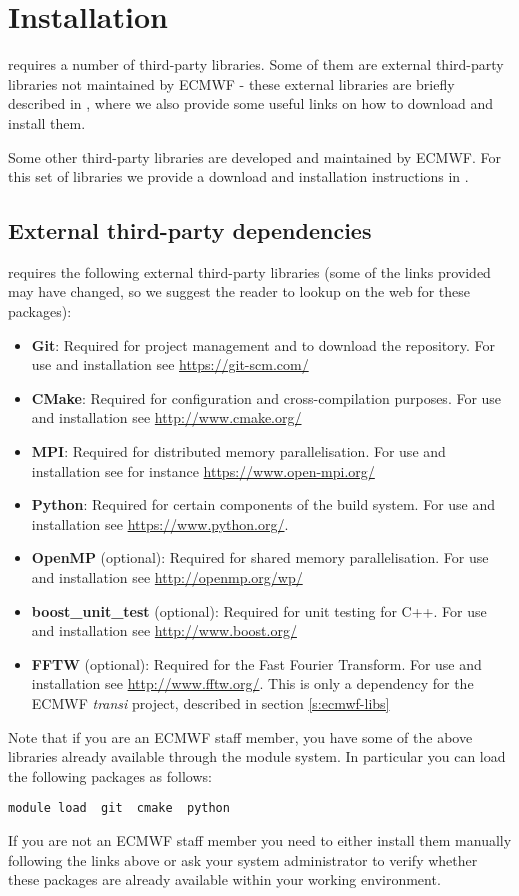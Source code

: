 \section{Installation}
\label{s:installation}
\Atlas requires a number of third-party libraries. 
Some of them are external third-party libraries not maintained 
by ECMWF - these external libraries are briefly described 
in , where we also provide some 
useful links on how to download and install them. 

Some other third-party libraries are developed and maintained 
by ECMWF. For this set of libraries we provide a download and 
installation instructions in .

\subsection{External third-party dependencies}
\label{s:external-libs}
\Atlas requires the following external third-party libraries 
(some of the links provided may have changed, so we suggest 
the reader to lookup on the web for these packages):
%
\begin{itemize}
\item \textbf{Git}: Required for project management and to download 
the repository. For use and installation see \url{https://git-scm.com/}
\item \textbf{CMake}: Required for configuration and cross-compilation 
purposes. For use and installation see \url{http://www.cmake.org/}
\item \textbf{MPI}: Required for distributed memory parallelisation.
For use and installation see for instance \url{https://www.open-mpi.org/}
\item \textbf{Python}: Required for certain components of the build system.
For use and installation see \url{https://www.python.org/}.
\item \textbf{OpenMP} (optional): Required for shared memory 
parallelisation. For use and installation see \url{http://openmp.org/wp/}
\item \textbf{boost\_unit\_test} (optional): Required for unit testing 
for C++. For use and installation see \url{http://www.boost.org/}
\item \textbf{FFTW} (optional): Required for the Fast Fourier Transform.
For use and installation see \url{http://www.fftw.org/}. This is only a
dependency for the ECMWF \emph{transi} project, described in section \ref{s:ecmwf-libs}
\end{itemize}
%
Note that if you are an ECMWF staff member, you have some of the above 
libraries already available through the module system. In particular 
you can load the following packages as follows:
%
\begin{lstlisting}[style=BashStyle]
module load  git  cmake  python
\end{lstlisting}
%
If you are not an ECMWF staff member you need to either install them 
manually following the links above or ask your system administrator 
to verify whether these packages are already available within your 
working environment.


